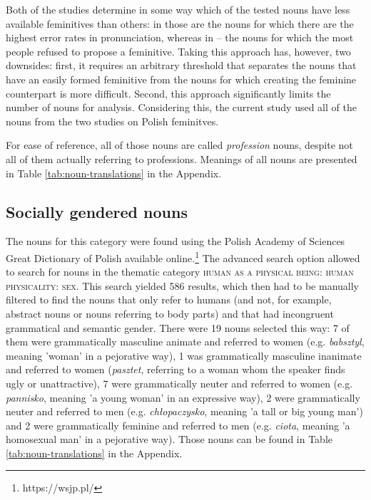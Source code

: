 Both of the studies determine in some way which of the tested nouns have less available feminitives than others: in \cite{szpyra-kozlowska_czy_2022} those are the nouns for which there are the highest error rates in pronunciation, whereas in \cite{szpyra-kozlowska_premiera_2019} -- the nouns for which the most people refused to propose a feminitive. Taking this approach has, however, two downsides: first, it requires an arbitrary threshold that separates the nouns that have an easily formed feminitive from the nouns for which creating the feminine counterpart is more difficult. Second, this approach significantly limits the number of nouns for analysis. Considering this, the current study used all of the nouns from the two studies on Polish feminitves.

For ease of reference, all of those nouns are called \textsl{profession} nouns, despite not all of them actually referring to professions. Meanings of all nouns are presented in Table \ref{tab:noun-translations} in the Appendix.

\subsection{Socially gendered nouns}
The nouns for this category were found using the Polish Academy of Sciences Great Dictionary of Polish available online.\footnote{https://wsjp.pl/} The advanced search option allowed to search for nouns in the thematic category \textsc{human as a physical being: human physicality: sex}. This search yielded 586 results, which then had to be manually filtered to find the nouns that only refer to humans (and not, for example, abstract nouns or nouns referring to body parts) and that had incongruent grammatical and semantic gender. There were 19 nouns selected this way: 7 of them were grammatically masculine animate and referred to women (e.g. \textsl{babsztyl}, meaning 'woman' in a pejorative way), 1 was grammatically masculine inanimate and referred to women (\textsl{pasztet}, referring to a woman whom the speaker finds ugly or unattractive), 7 were grammatically neuter and referred to women (e.g. \textsl{pannisko}, meaning 'a young woman' in an expressive way), 2 were grammatically neuter and referred to men (e.g. \textsl{chłopaczysko}, meaning 'a tall or big young man') and 2 were grammatically feminine and referred to men (e.g. \textsl{ciota}, meaning 'a homosexual man' in a pejorative way). Those nouns can be found in Table \ref{tab:noun-translations} in the Appendix.

